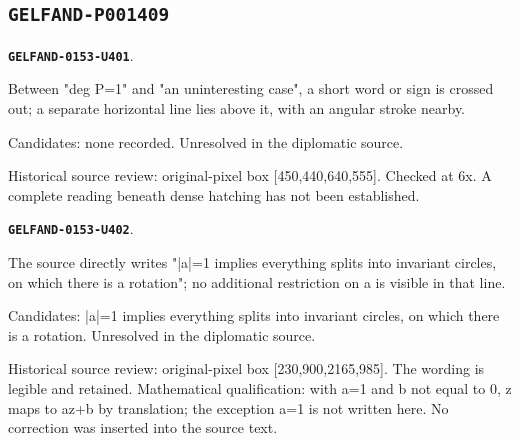 \documentclass[11pt]{article}
\theoremstyle{definition}
\theoremstyle{remark}
\begin{document}
\subsection*{\texttt{GELFAND-P001409}}
\par\noindent\leavevmode{}\label{GELFAND-0153-U401}\label{GELFAND-P001409:degree-one-cancellation:note}\textbf{\texttt{GELFAND-0153-U401}}.\nopagebreak[4]\par
Between "deg P=1" and "an uninteresting case", a short word or sign is crossed out; a separate horizontal line lies above it, with an angular stroke nearby.\par
Candidates: none recorded. Unresolved in the diplomatic source.\par
Historical source review: original-pixel box [450,440,640,555]. Checked at 6x. A complete reading beneath dense hatching has not been established.\par\medskip
\par\noindent\leavevmode{}\label{GELFAND-0153-U402}\label{GELFAND-P001409:unit-modulus-claim:note}\textbf{\texttt{GELFAND-0153-U402}}.\nopagebreak[4]\par
The source directly writes "|a|=1 implies everything splits into invariant circles, on which there is a rotation"; no additional restriction on a is visible in that line.\par
Candidates: |a|=1 implies everything splits into invariant circles, on which there is a rotation. Unresolved in the diplomatic source.\par
Historical source review: original-pixel box [230,900,2165,985]. The wording is legible and retained. Mathematical qualification: with a=1 and b not equal to 0, z maps to az+b by translation; the exception a=1 is not written here. No correction was inserted into the source text.\par\medskip
\end{document}
